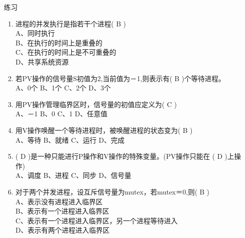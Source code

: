 \begin{frame}{练习}
  \begin{enumerate}
  \item 进程的并发执行是指若干个进程( {\color{white} B}  ) \\
    A、同时执行          \\
    B、在执行的时间上是重叠的\\
    C、在执行的时间上是不可重叠的\\  
    D、共享系统资源 \\

  \item 若PV操作的信号量S初值为2,当前值为－1,则表示有( {\color{white} B}  )个等待进程。\\
    A、0个 \hspace{1cm}    B、1个 \hspace{1cm}   C、2个  \hspace{1cm}    D、3个

  \item 用PV操作管理临界区时，信号量的初值应定义为( {\color{white} C}  ) \\
    A、－1  \hspace{1cm}    B、0  \hspace{1cm}    C、1   \hspace{1cm}   D、任意值

  \item 用V操作唤醒一个等待进程时，被唤醒进程的状态变为( {\color{white} B}  ) \\
    A、等待  \hspace{1cm}  B、就绪   \hspace{1cm}  C、运行  \hspace{1cm}  D、完成

  \item ( {\color{white} D} )是一种只能进行P操作和V操作的特殊变量。(PV操作只能在
    ( {\color{white} D} )上操作) \\
    A、调度  \hspace{1cm} B、进程  \hspace{1cm} C、同步  \hspace{1cm} D、信号量

  \item 对于两个并发进程，设互斥信号量为mutex，若mutex＝0,则({\color{white} B} ) \\
    A、表示没有进程进入临界区 \\
    B、表示有一个进程进入临界区 \\
    C、表示有一个进程进入临界区，另一个进程等待进入 \\
    D、表示有两个进程进入临界区 \\


\end{enumerate}
\end{frame}
